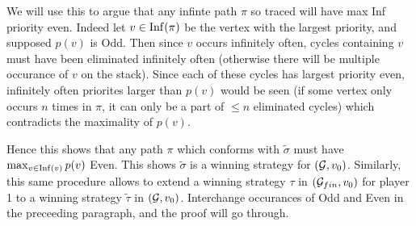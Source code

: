 We will use this to argue that any infinte path $\pi$ so traced will have max Inf priority even. Indeed let $v \in \operatorname*{Inf}(\pi)$ be the vertex with the largest priority, and supposed $p(v)$ is Odd. Then since $v$ occurs infinitely often, cycles containing $v$ must have been eliminated infinitely often (otherwise there will be multiple occurance of $v$ on the stack). Since each of these cycles has largest priority even, infinitely often priorites larger than $p(v)$ would be seen (if some vertex only occurs $n$ times in $\pi$, it can only be a part of $\leq n$ eliminated cycles) which contradicts the maximality of $p(v)$.

Hence this shows that any path $\pi$ which conforms with $\tilde{\sigma}$ must have $\max_{v \in \operatorname*{Inf}(v)} p(v)$ Even. This shows $\tilde{\sigma}$ is a winning strategy for $(\mathcal{G},v_0)$. Similarly, this same procedure allows to extend a winning strategy $\tau$ in $(\mathcal{G}_{fin}, v_0)$ for player 1 to a winning strategy $\tilde{\tau}$ in $(\mathcal{G},v_0)$. Interchange occurances of Odd and Even in the preceeding paragraph, and the proof will go through.




